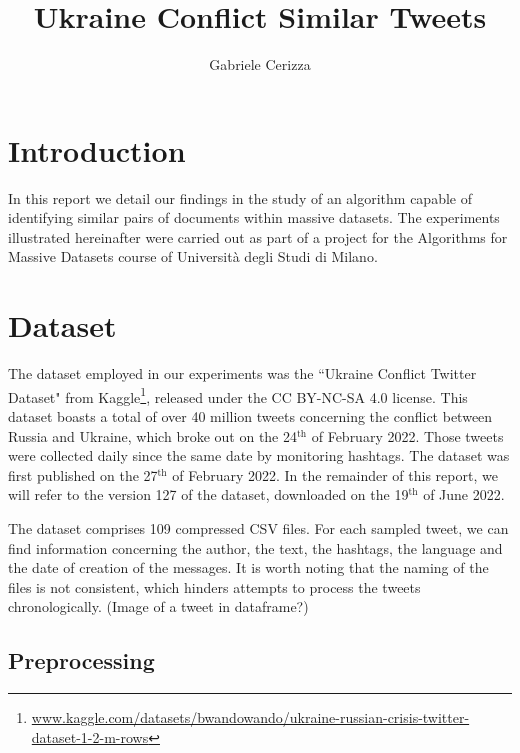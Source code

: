 \documentclass[runningheads]{llncs}
\begin{document}
\title{
    Ukraine Conflict Similar Tweets
}
\author{Gabriele Cerizza}


\maketitle

\section{Introduction}
\label{sec:introduction}

In this report we detail our findings in the study of an algorithm capable of identifying similar pairs of documents within massive datasets. The experiments illustrated hereinafter were carried out as part of a project for the Algorithms for Massive Datasets course of Università degli Studi di Milano.

\section{Dataset}
\label{sec:dataset}

The dataset employed in our experiments was the “Ukraine Conflict Twitter Dataset" from Kaggle\footnote{\url{www.kaggle.com/datasets/bwandowando/ukraine-russian-crisis-twitter-dataset-1-2-m-rows}}, released under the CC BY-NC-SA 4.0 license. This dataset boasts a total of over 40 million tweets concerning the conflict between Russia and Ukraine, which broke out on the 24$^{\text{th}}$ of February 2022. Those tweets were collected daily since the same date by monitoring hashtags. The dataset was first published on the 27$^{\text{th}}$ of February 2022. In the remainder of this report, we will refer to the version 127 of the dataset, downloaded on the 19$^{\text{th}}$ of June 2022. 

The dataset comprises 109 compressed CSV files. For each sampled tweet, we can find information concerning the author, the text, the hashtags, the language and the date of creation of the messages. It is worth noting that the naming of the files is not consistent, which hinders attempts to process the tweets chronologically. (Image of a tweet in dataframe?)

\subsection{Preprocessing}
\end{document}
